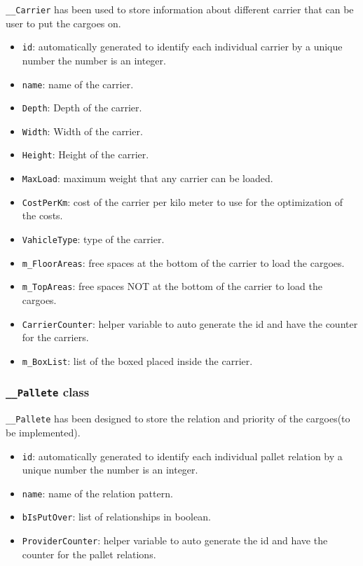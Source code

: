 \documentclass[oneside,titlepage,12pt]{memoir}
\begin{document}
\texttt{\_\_Carrier} has been used to store information about different
carrier that can be user to put the cargoes on.

\begin{itemize}
\itemsep1pt\parskip0pt
\item
  \texttt{id}: automatically generated to identify each individual
  carrier by a unique number the number is an integer.
\item
  \texttt{name}: name of the carrier.
\item
  \texttt{Depth}: Depth of the carrier.
\item
  \texttt{Width}: Width of the carrier.
\item
  \texttt{Height}: Height of the carrier.
\item
  \texttt{MaxLoad}: maximum weight that any carrier can be loaded.
\item
  \texttt{CostPerKm}: cost of the carrier per kilo meter to use for the
  optimization of the costs.
\item
  \texttt{VahicleType}: type of the carrier.
\item
  \texttt{m\_FloorAreas}: free spaces at the bottom of the carrier to
  load the cargoes.
\item
  \texttt{m\_TopAreas}: free spaces NOT at the bottom of the carrier to
  load the cargoes.
\item
  \texttt{CarrierCounter}: helper variable to auto generate the id and
  have the counter for the carriers.
\item
  \texttt{m\_BoxList}: list of the boxed placed inside the carrier.
\end{itemize}

\subsubsection{\texttt{\_\_Pallete} class}\label{pallete-class}

\texttt{\_\_Pallete} has been designed to store the relation and
priority of the cargoes(to be implemented).

\begin{itemize}
\itemsep1pt\parskip0pt
\item
  \texttt{id}: automatically generated to identify each individual
  pallet relation by a unique number the number is an integer.
\item
  \texttt{name}: name of the relation pattern.
\item
  \texttt{bIsPutOver}: list of relationships in boolean.
\item
  \texttt{ProviderCounter}: helper variable to auto generate the id and
  have the counter for the pallet relations.
\end{itemize}
\end{document}
